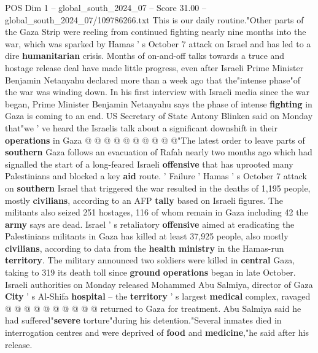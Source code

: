 \begin{textsample}{POS Dim 1 – global\_south\_2024\_07 – Score 31.00 – global\_south\_2024\_07/109786266.txt}
This is our daily routine."Other parts of the Gaza Strip were reeling from continued fighting nearly nine months into the war, which was sparked by Hamas ' s October 7 attack on Israel and has led to a dire \textbf{humanitarian} crisis.
Months of on-and-off talks towards a truce and hostage release deal have made little progress, even after Israeli Prime Minister Benjamin Netanyahu declared more than a week ago that the"intense phase"of the war was winding down.
In his first interview with Israeli media since the war began, Prime Minister Benjamin Netanyahu says the phase of intense \textbf{fighting} in Gaza is coming to an end.
US Secretary of State Antony Blinken said on Monday that"we ' ve heard the Israelis talk about a significant downshift in their \textbf{operations} in Gaza @ @ @ @ @ @ @ @ @ @"The latest order to leave parts of \textbf{southern} Gaza follows an evacuation of Rafah nearly two months ago which had signalled the start of a long-feared Israeli \textbf{offensive} that has uprooted many Palestinians and blocked a key \textbf{aid} route. ' Failure ' Hamas ' s October 7 attack on \textbf{southern} Israel that triggered the war resulted in the deaths of 1,195 people, mostly \textbf{civilians}, according to an AFP \textbf{tally} based on Israeli figures.
The militants also seized 251 hostages, 116 of whom remain in Gaza including 42 the \textbf{army} says are dead.
Israel ' s retaliatory \textbf{offensive} aimed at eradicating the Palestinians militants in Gaza has killed at least 37,925 people, also mostly \textbf{civilians}, according to data from the \textbf{health} \textbf{ministry} in the Hamas-run \textbf{territory}.
The military announced two soldiers were killed in \textbf{central} Gaza, taking to 319 its death toll since \textbf{ground} \textbf{operations} began in late October.
Israeli authorities on Monday released Mohammed Abu Salmiya, director of Gaza \textbf{City} ' s Al-Shifa \textbf{hospital} -- the \textbf{territory} ' s largest \textbf{medical} complex, ravaged @ @ @ @ @ @ @ @ @ @ returned to Gaza for treatment.
Abu Salmiya said he had suffered"\textbf{severe} torture"during his detention."Several inmates died in interrogation centres and were deprived of \textbf{food} and \textbf{medicine},"he said after his release.

\end{textsample}
